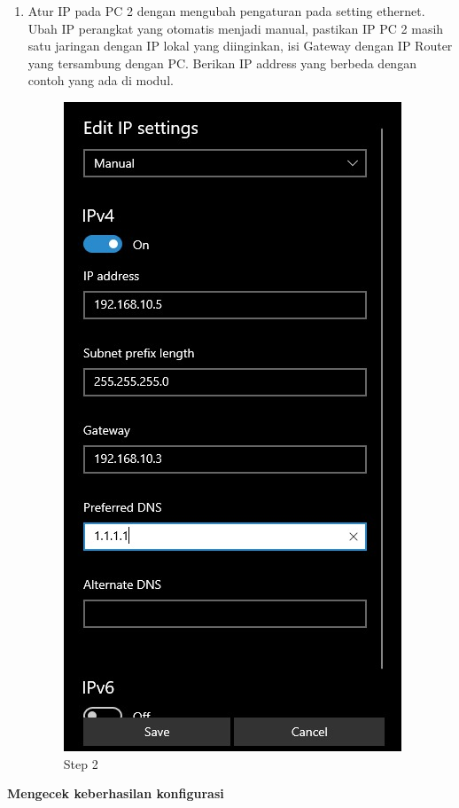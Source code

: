 \begin{enumerate}
	\item Atur IP pada PC 2 dengan mengubah pengaturan pada setting ethernet. Ubah IP perangkat
	yang otomatis menjadi manual, pastikan IP PC 2 masih satu jaringan dengan IP lokal yang
	diinginkan, isi Gateway dengan IP Router yang tersambung dengan PC. Berikan IP address
	yang berbeda dengan contoh yang ada di modul.
	\begin{figure}[H]
		\centering
		\includegraphics[width=0.5\linewidth]{P1/img/per3pc2step6.jpg}
		\caption{Step 2}
		\label{fig:gambar27}
	\end{figure}

\end{enumerate}

\begin{center} 
	\textbf{Mengecek keberhasilan konfigurasi}
\end{center}

